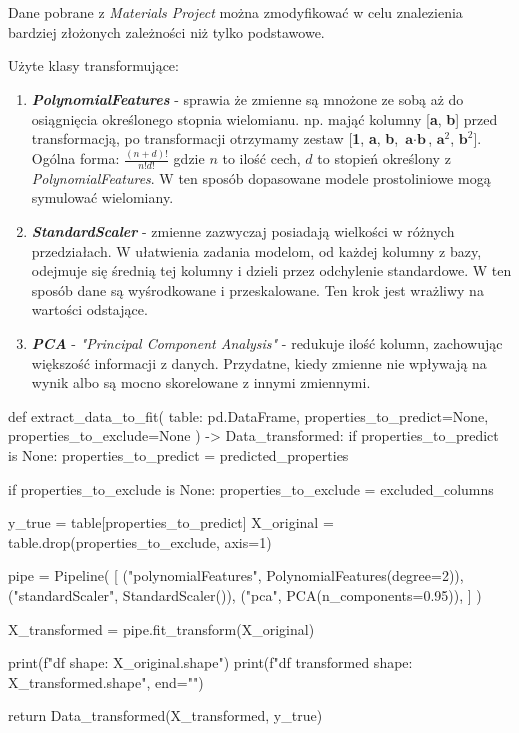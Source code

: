 \\ \\
 
\hspace{1.5cm} Dane pobrane z \textit{Materials Project} można zmodyfikować w celu znalezienia bardziej złożonych zależności niż tylko podstawowe.

Użyte klasy transformujące:
\begin{enumerate}
    \item {\textbf{\textit{PolynomialFeatures}} - sprawia że zmienne są mnożone ze sobą aż do osiągnięcia określonego stopnia wielomianu. np. mająć kolumny [\textbf{a}, \textbf{b}] przed transformacją, po transformacji otrzymamy zestaw [\textbf{1}, \textbf{a}, \textbf{b}, $\textbf{a} \cdot \textbf{b}$, $\textbf{a}^2$, $\textbf{b}^2$]}. Ogólna forma: $\frac{(n+d)!}{n!d!}$ gdzie $n$ to ilość cech, $d$ to stopień określony z \textit{PolynomialFeatures}. W ten sposób dopasowane modele prostoliniowe mogą symulować wielomiany.
    \item {\textbf{\textit{StandardScaler}} - zmienne zazwyczaj posiadają wielkości w różnych przedziałach. W ułatwienia zadania modelom, od każdej kolumny z bazy, odejmuje się średnią tej kolumny i dzieli przez odchylenie standardowe. W ten sposób dane są wyśrodkowane i przeskalowane.  Ten krok jest wrażliwy na wartości odstające. }
    \item {\textbf{\textit{PCA}} - \textit{"Principal Component Analysis"} - redukuje ilość kolumn, zachowując większość informacji z danych. Przydatne, kiedy zmienne nie wpływają na wynik albo są mocno skorelowane z innymi zmiennymi.}
\end{enumerate}


\begin{pythoncode}
def extract_data_to_fit(
    table: pd.DataFrame, properties_to_predict=None, properties_to_exclude=None
) -> Data_transformed:
    if properties_to_predict is None:
        properties_to_predict = predicted_properties

    if properties_to_exclude is None:
        properties_to_exclude = excluded_columns

    y_true = table[properties_to_predict]
    X_original = table.drop(properties_to_exclude, axis=1)

    pipe = Pipeline(
        [
            ("polynomialFeatures", PolynomialFeatures(degree=2)),
            ("standardScaler", StandardScaler()),
            ("pca", PCA(n_components=0.95)),
        ]
    )

    X_transformed = pipe.fit_transform(X_original)

    print(f"df shape: {X_original.shape}")
    print(f"df transformed shape: {X_transformed.shape}", end="\n\n")

    return Data_transformed(X_transformed, y_true)
\end{pythoncode}



